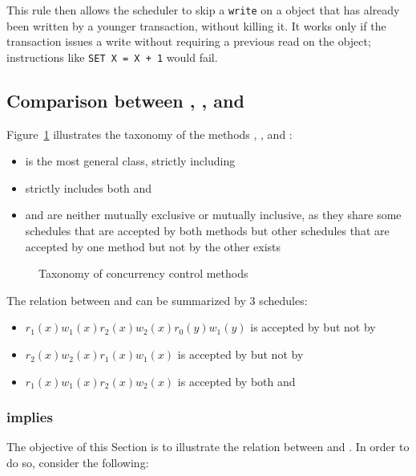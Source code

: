 \documentclass[english]{article}
\begin{document}
This rule then allows the scheduler to skip a \texttt{write} on a object that has already been written by a younger transaction, without killing it.
It works only if the transaction issues a write without requiring a previous read on the object;
instructions like \texttt{SET X = X + 1} would fail.

\subsection{Comparison between \VSR, \CSR, \TPL and \TS}

Figure~\ref{fig:concurrency-control-comparison} illustrates the taxonomy of the methods \VSR, \CSR, \TPL and \TS:

\begin{itemize}
  \item \VSR is the most general class, strictly including \CSR
  \item \CSR strictly includes both \TPL and \TS
  \item \TPL and \TS are neither mutually exclusive or mutually inclusive, as they share some schedules that are accepted by both methods but other schedules that are accepted by one method but not by the other exists
\end{itemize}

\begin{figure}[htbp]
  \centering
  \bigskip
  \caption{Taxonomy of concurrency control methods}
  \label{fig:concurrency-control-comparison}
  \bigskip
\end{figure}

\bigskip
The relation between \TS and \TPL can be summarized by \(3\) schedules:

\begin{itemize}
  \item \(r_1(x) w_1(x) r_2(x) w_2(x) r_0(y) w_1(y)\) is accepted by \TS but not by \TPL
  \item \(r_2(x) w_2(x) r_1(x) w_1(x)\) is accepted by \TPL but not by \TS
  \item \(r_1(x) w_1(x) r_2(x) w_2(x)\) is accepted by both \TS and \TPL
\end{itemize}

\subsubsection{\TS implies \CSR}

The objective of this Section is to illustrate the relation between \TS and \CSR.
In order to do so, consider the following:
\end{document}
